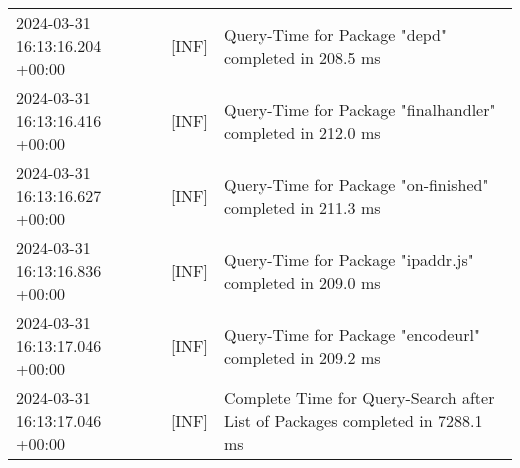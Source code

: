 {{\begin{tabularx}{\textwidth}{|l|l|X|}
                    2024-03-31 16:13:16.204 +00:00 & [INF] & Query-Time for Package "depd" completed in 208.5 ms \\
                    2024-03-31 16:13:16.416 +00:00 & [INF] & Query-Time for Package "finalhandler" completed in 212.0 ms \\
                    2024-03-31 16:13:16.627 +00:00 & [INF] & Query-Time for Package "on-finished" completed in 211.3 ms \\
                    2024-03-31 16:13:16.836 +00:00 & [INF] & Query-Time for Package "ipaddr.js" completed in 209.0 ms \\
                    2024-03-31 16:13:17.046 +00:00 & [INF] & Query-Time for Package "encodeurl" completed in 209.2 ms \\
                    2024-03-31 16:13:17.046 +00:00 & [INF] & Complete Time for Query-Search after List of Packages completed in 7288.1 ms \\
                    \hline
                \end{tabularx}
            }
        }

